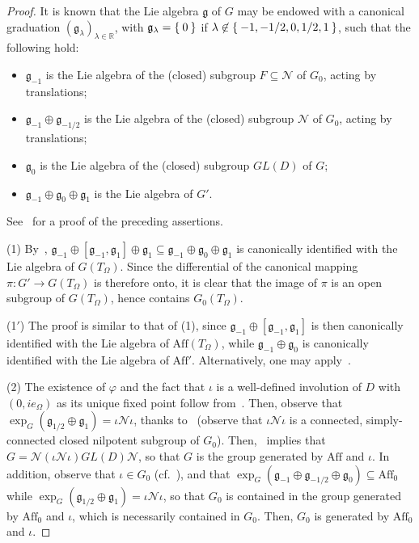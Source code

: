 \documentclass[10.5pt,reqno]{amsart}
\newcommand{\Aff}{\mathrm{Aff}}
\newcommand{\R}{\mathds{R}}
\newcommand{\gf}{\mathfrak{g}}
\newcommand{\Nc}{\mathcal{N}}
\renewcommand{\phi}{\varphi}
\begin{document}
\begin{proof}
	It is known that the Lie algebra $\gf$ of $G$ may be endowed with a canonical graduation $(\gf_\lambda)_{\lambda\in \R}$, with $\gf_\lambda=\Set{0}$ if $\lambda\not \in \Set{-1,-1/2,0,1/2,1}$, such that the following hold:
	\begin{itemize}
		\item $\gf_{-1}$ is the Lie algebra of the (closed) subgroup $F\subseteq \Nc$ of $G_0$, acting by translations;
		
		\item $\gf_{-1}\oplus \gf_{-1/2}$ is the Lie algebra of the (closed) subgroup $\Nc$ of $G_0$, acting by translations;
		
		\item $\gf_0$ is the Lie algebra of the (closed) subgroup $GL(D)$ of $G$;
		
		\item $\gf_{-1}\oplus \gf_0\oplus \gf_1$ is the Lie algebra of $G'$.
	\end{itemize}
	See~\cite[Proposition 6.1, Theorem 6.3, Theorem 7.1 and its Corollary]{Murakami} for a proof of the preceding assertions.
	
	(1) By~\cite[Proposition 4.5]{Nakajima2}, $\gf_{-1}\oplus [\gf_{-1},\gf_1]\oplus \gf_1\subseteq \gf_{-1}\oplus \gf_0\oplus \gf_1$ is canonically identified with the Lie algebra of $G(T_\Omega)$. Since the differential of the canonical mapping $\pi\colon G'\to G(T_\Omega)$ is therefore onto, it is clear that the image of $\pi$ is an open subgroup of $G(T_\Omega)$, hence contains $G_0(T_\Omega)$.
	
	(1$'$) The proof is similar to that of (1), since $\gf_{-1}\oplus [\gf_{-1},\gf_1]$ is then canonically identified with the Lie algebra of $\Aff(T_\Omega)$, while $\gf_{-1}\oplus \gf_0$ is canonically identified with the Lie algebra of $\Aff'$. Alternatively, one may apply~\cite[Proposition 4.1 of Chapter V]{Satake}.
	
	(2) The existence of $\phi$ and the fact that $\iota$ is a well-defined involution of $D$ with $(0,i e_\Omega)$ as its unique fixed point follow from~\cite[Corollary 3.6]{Dorfmeister}.
	Then, observe that $\exp_G(\gf_{1/2}\oplus \gf_1)=\iota \Nc \iota$, thanks to~\cite[Theorem 3.9]{Dorfmeister} (observe that $\iota \Nc \iota$ is a connected, simply-connected closed nilpotent subgroup of $G_0$). Then,~\cite[Theorem 6.1]{Dorfmeister} implies that $G=\Nc (\iota \Nc \iota) GL(D) \Nc$, so that $G$ is the group generated by $\Aff$ and $\iota$. In addition, observe that $\iota\in G_0$ (cf.~\cite[Theorem 3.5]{Dorfmeister}), and that $\exp_G(\gf_{-1}\oplus\gf_{-1/2}\oplus\gf_0)\subseteq \Aff_0$ while $\exp_G(\gf_{1/2}\oplus \gf_1)= \iota \Nc \iota$, so that $G_0$ is contained in the group generated by $\Aff_0$ and $\iota$, which is necessarily contained in $G_0$. Then, $G_0$ is generated by $\Aff_0$ and $\iota$.
	

\end{proof}
\end{document}
